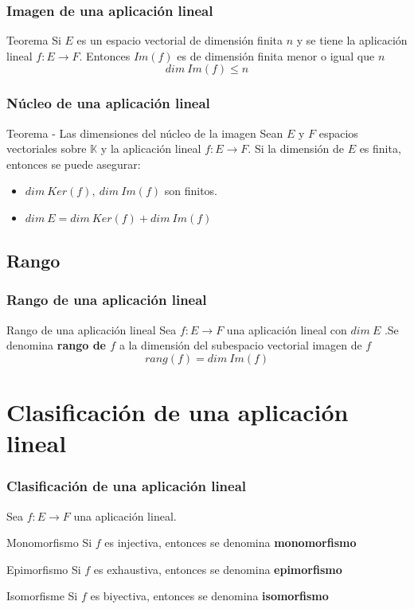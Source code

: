 \documentclass{beamer}
\begin{document}
\begin{frame}
  \frametitle{Imagen de una aplicaci\'on lineal}
 \begin{block}{Teorema} 
Si $E$ es un espacio vectorial de dimensi\'on finita $n$ y se tiene la aplicaci\'on lineal $f:E\rightarrow F$. Entonces $Im(f)$ es de dimensi\'on finita menor o igual que $n$
\[dim \ Im(f) \leq n\]
\end{block} 
 \end{frame}

\begin{frame}
  \frametitle{N\'ucleo de una aplicaci\'on lineal}
 \begin{block}{Teorema - Las dimensiones del n\'ucleo de la imagen} 
Sean $E$ y $F$ espacios vectoriales sobre $\mathbb K$ y la aplicaci\'on lineal $f:E\rightarrow F$. Si la dimensi\'on de $E$ es finita, entonces se puede asegurar:
\begin{itemize}
\item $dim\ Ker(f), \ dim\ Im(f)$ son finitos.
\item $dim\ E = dim\ Ker(f)+dim\ Im(f)$
\end{itemize}
\end{block} 
 \end{frame}

\subsection{Rango}
\begin{frame}
  \frametitle{Rango de una aplicaci\'on lineal}
 \begin{block}{Rango de una aplicaci\'on lineal} 
Sea $f:E\rightarrow F$ una aplicaci\'on lineal con $dim\ E$ .Se denomina \textbf{rango de $f$} a la dimensi\'on del subespacio vectorial imagen de $f$
\[rang(f) = dim\ Im(f)\]
\end{block} 
 \end{frame}
 
 
\section{Clasificaci\'on de una aplicaci\'on lineal}

\begin{frame}
  \frametitle{Clasificaci\'on de una aplicaci\'on lineal}
  Sea $f:E\rightarrow F$ una aplicaci\'on lineal.
 \begin{block}{Monomorfismo} 
Si $f$ es injectiva, entonces se denomina \textbf{monomorfismo} 
\end{block} 
 \begin{block}{Epimorfismo} 
Si $f$ es exhaustiva, entonces se denomina \textbf{epimorfismo} 
\end{block} 
 \begin{block}{Isomorfisme} 
Si $f$ es biyectiva, entonces se denomina \textbf{isomorfismo} 
\end{block} 
 \end{frame}
 
\end{document}
